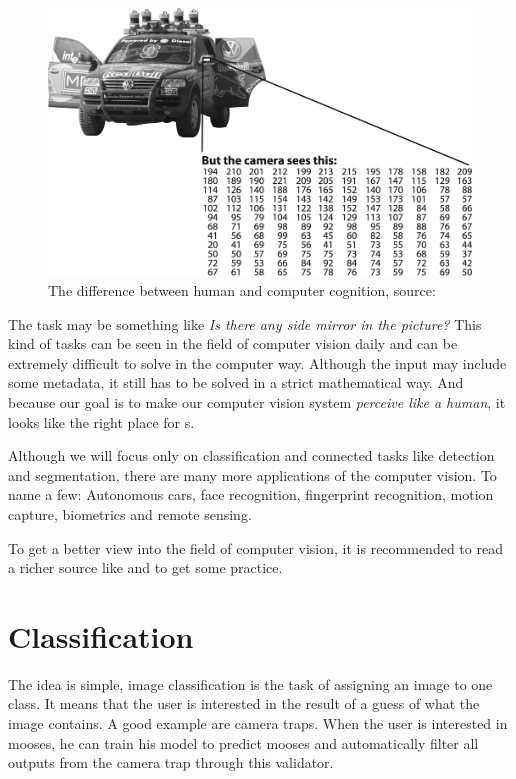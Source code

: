 \begin{figure}[H]
   \centering
	\includegraphics[width=.8\linewidth]{./pictures/comp-vision.png}
	\caption[Human and computer cognition]{The difference between human and computer cognition, source: \cite{opencv}}
      \label{fig:mirror}
\end{figure}

The task may be something like \textit{Is there any side mirror in the picture?} This kind of tasks can be seen in the field of computer vision daily and can be extremely difficult to solve in the computer way. Although the input may include some metadata, it still has to be solved in a strict mathematical way. And because our goal is to make our computer vision system \textit{perceive like a human}, it looks like the right place for s.

Although we will focus only on classification and connected tasks like detection and segmentation, there are many more applications of the computer vision. To name a few: Autonomous cars, face recognition, fingerprint recognition, motion capture, biometrics and remote sensing.

To get a better view into the field of computer vision, it is recommended to read a richer source like \cite{comp-vision} and \cite{opencv} to get some practice.

\section{Classification}
\label{classification}

The idea is simple, image classification is the task of assigning an image to one class. It means that the user is interested in the result of a guess of what the image contains. A good example are camera traps. When the user is interested in mooses, he can train his model to predict mooses and automatically filter all outputs from the camera trap through this validator.

